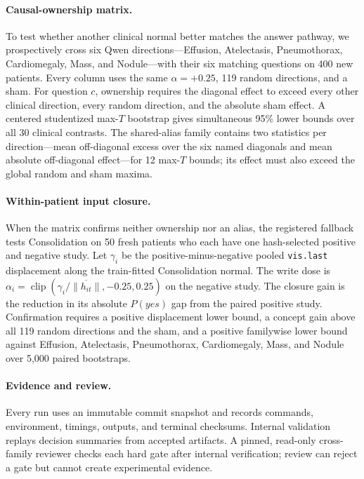 \paragraph{Causal-ownership matrix.}
To test whether another clinical normal better matches the answer pathway, we prospectively cross six Qwen directions---Effusion, Atelectasis, Pneumothorax, Cardiomegaly, Mass, and Nodule---with their six matching questions on 400 new patients. Every column uses the same $\alpha=+0.25$, 119 random directions, and a sham. For question $c$, ownership requires the diagonal effect to exceed every other clinical direction, every random direction, and the absolute sham effect. A centered studentized max-$T$ bootstrap gives simultaneous 95\% lower bounds over all 30 clinical contrasts. The shared-alias family contains two statistics per direction---mean off-diagonal excess over the six named diagonals and mean absolute off-diagonal effect---for 12 max-$T$ bounds; its effect must also exceed the global random and sham maxima.

\paragraph{Within-patient input closure.}
When the matrix confirms neither ownership nor an alias, the registered fallback tests Consolidation on 50 fresh patients who each have one hash-selected positive and negative study. Let $\gamma_i$ be the positive-minus-negative pooled \texttt{vis.last} displacement along the train-fitted Consolidation normal. The write dose is $\alpha_i=\operatorname{clip}(\gamma_i/\overline{\lVert h_{it}\rVert},-0.25,0.25)$ on the negative study. The closure gain is the reduction in its absolute $P(yes)$ gap from the paired positive study. Confirmation requires a positive displacement lower bound, a concept gain above all 119 random directions and the sham, and a positive familywise lower bound against Effusion, Atelectasis, Pneumothorax, Cardiomegaly, Mass, and Nodule over 5,000 paired bootstraps.

\paragraph{Evidence and review.}
Every run uses an immutable commit snapshot and records commands, environment, timings, outputs, and terminal checksums. Internal validation replays decision summaries from accepted artifacts. A pinned, read-only cross-family reviewer checks each hard gate after internal verification; review can reject a gate but cannot create experimental evidence.
